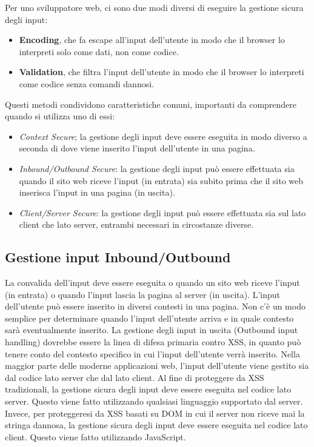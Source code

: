 Per uno sviluppatore web, ci sono due modi diversi di eseguire la gestione sicura
degli input:

\begin{itemize}
      \item \textbf{Encoding}, che fa escape all'input dell'utente in modo che
            il browser lo interpreti solo
            come dati, non come codice.
      \item \textbf{Validation}, che filtra l'input dell'utente in modo che il
            browser lo interpreti come codice
            senza comandi dannosi.
\end{itemize}

Questi metodi condividono caratteristiche comuni, importanti da comprendere
quando si utilizza uno di essi:

\begin{itemize}
      \item \textit{Context Secure}; la gestione degli input deve essere eseguita
            in modo diverso a
            seconda di dove viene inserito l'input dell'utente in una pagina.
      \item \textit{Inbound/Outbound Secure}: la gestione degli input può essere
            effettuata sia quando il
            sito web riceve l'input (in entrata) sia subito prima che il
            sito web
            inserisca l'input in una pagina (in uscita).
      \item \textit{Client/Server Secure}: la gestione degli input può essere
            effettuata sia sul lato client
            che lato server, entrambi necessari in circostanze diverse.
\end{itemize}

\subsection{Gestione input Inbound/Outbound}

La convalida dell'input deve essere eseguita o quando un sito web riceve l'input
(in entrata)
o quando l'input lascia la pagina al server (in uscita).
L'input dell'utente può essere inserito in diversi contesti in una pagina.
Non c'è un modo
semplice per determinare quando l'input dell'utente arriva e in quale contesto sarà
eventualmente inserito. La gestione degli input in uscita (Outbound input handling)
dovrebbe
essere la linea di difesa primaria contro XSS, in quanto può tenere conto del
contesto
specifico in cui l'input dell'utente verrà inserito.
Nella maggior parte delle moderne applicazioni web, l'input dell'utente viene
gestito sia dal
codice lato server che dal lato client.
Al fine di proteggere da XSS tradizionali, la gestione sicura degli input deve
essere
eseguita nel codice lato server. Questo viene fatto utilizzando qualsiasi linguaggio
supportato dal server. Invece, per proteggeresi da XSS basati su DOM in cui il
server non riceve mai la stringa
dannosa, la gestione sicura degli input deve essere eseguita nel codice lato client.
Questo viene fatto utilizzando JavaScript.

